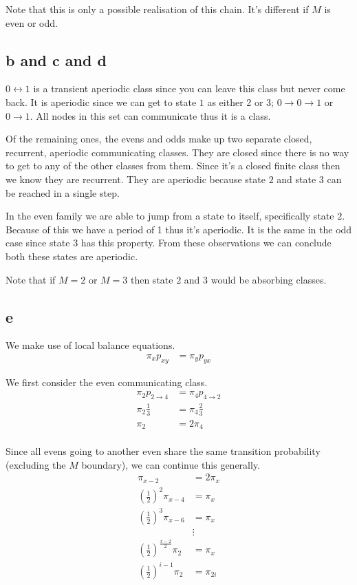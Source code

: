 \documentclass{article}
\begin{document}
Note that this is only a possible realisation of this chain. It's different if
$M$ is even or odd.

\subsection{b and c and d}
$0 \leftrightarrow 1$ is a transient aperiodic class since you can leave this
class but never come back. It is aperiodic since we can get to state $1$ as
either 2 or 3; $0 \to 0 \to 1$ or $0 \to 1$.
All nodes in this set can communicate thus it is a class.

Of the remaining ones, the evens and odds make up two separate closed,
recurrent, aperiodic communicating classes. They are closed since there is no
way to get to any of the other classes from them.
Since it's a closed finite class then we know they are recurrent.
They are aperiodic because state $2$ and state $3$ can be reached in a single
step.

In the even family we are able to jump from a state to itself, specifically
state $2$. Because of this we have a period of 1 thus it's aperiodic.
It is the same in the odd case since state $3$ has this property.
From these observations we can conclude both these states are aperiodic.

Note that if $M=2$ or $M=3$ then state $2$ and $3$ would be absorbing classes.

\subsection{e}
We make use of local balance equations.
\begin{align*}
    \pi_x p_{xy} &= \pi_y p_{yx}
\end{align*}

We first consider the even communicating class.
\begin{align*}
    \pi_2 p_{2 \to 4} &= \pi_4 p_{4 \to 2} \\
    \pi_2 \frac{1}{3} &= \pi_4 \frac{2}{3} \\
    \pi_2 &= 2 \pi_4 \\
\end{align*}

Since all evens going to another even share the same transition probability
(excluding the $M$ boundary),
we can continue this generally.
\begin{align*}
    \pi_{x-2} &= 2 \pi_x \\
    {\left(\frac{1}{2}\right)}^2 \pi_{x-4} &= \pi_x \\
    {\left(\frac{1}{2}\right)}^3 \pi_{x-6} &= \pi_x \\
    &\vdots \\
    {\left(\frac{1}{2}\right)}^{\frac{x-2}{2}} \pi_{2} &= \pi_x \\
    {\left(\frac{1}{2}\right)}^{i-1} \pi_{2} &= \pi_{2i} \\
\end{align*}
\end{document}
